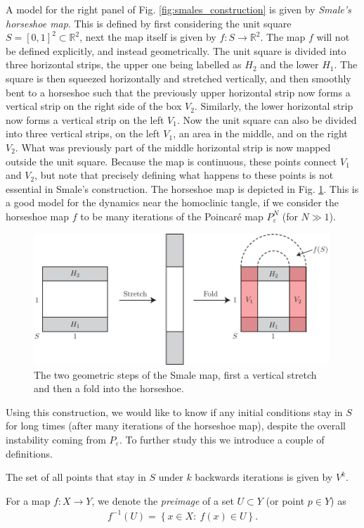 A model for the right panel of Fig. \ref{fig:smales_construction} is given by \emph{Smale's horseshoe map}. This is defined by first considering the unit square $S=[0,1]^2\subset \mathbb{R}^{2}$, next the map itself is given by $f:S\to\mathbb{R}^{2}$. The map $f$ will not be defined explicitly, and instead geometrically. The unit square is divided into three horizontal strips, the upper one being labelled as $H_2$ and the lower $H_1$. The square is then squeezed horizontally and stretched vertically, and then smoothly bent to a horseshoe such that the previously upper horizontal strip now forms a vertical strip on the right side of the box $V_2$. Similarly, the lower horizontal strip now forms a vertical strip on the left $V_1$. Now the unit square can also be divided into three vertical strips, on the left $V_1$, an area in the middle, and on the right $V_2$. What was previously part of the middle horizontal strip is now mapped outside the unit square. Because the map is continuous, these points connect $V_1$ and $V_2$, but note that precisely defining what happens to these points is not essential in Smale's construction. The horseshoe map is depicted in Fig. \ref{fig:smale_map}. This is a good model for the dynamics near the homoclinic tangle, if we consider the horseshoe map $f$ to be many iterations of the Poincaré map $P^N_\varepsilon$ (for $N\gg 1$).
\begin{figure}[h!]
	\centering
	\includegraphics[width=0.99\textwidth]{figures/ch6/17smale_map.pdf}
	\caption{The two geometric steps of the Smale map, first a vertical stretch and then a fold into the horseshoe.}
	\label{fig:smale_map}
\end{figure}

Using this construction, we would like to know if any initial conditions stay in $S$ for long times (after many iterations of the horseshoe map), despite the overall instability coming from $P_{\varepsilon}$. To further study this we introduce a couple of definitions.
\begin{definition}
	The set of all points that stay in $S$ under $k$ backwards iterations is given by $V^{k}$.
\end{definition}
\begin{definition}[]
	For a map $f:X \to Y$, we denote the \emph{preimage} of a set $U\subset Y$ (or point $p\in Y$) as
	\begin{align}
		\boxed{
			f^{-1}(U) = \left\{ x\in X:\ f(x) \in U\right\}.
		}
	\end{align}
\end{definition}

